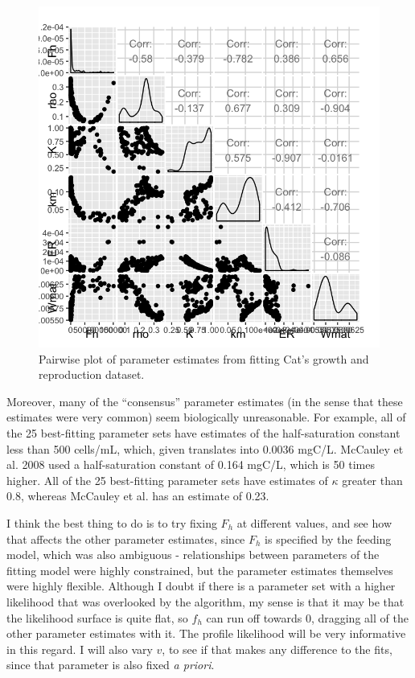 \documentclass[12pt,reqno,final,pdftex]{amsart}\usepackage[]{graphicx}\usepackage[]{color}
\newenvironment{knitrout}{}{} %
\theoremstyle{plain}
\numberwithin{equation}{part}
\begin{document}
\begin{knitrout}\scriptsize
{}\color{fgcolor}\begin{figure}

\includegraphics[width=\linewidth]{figure/Cat-fits-1-1} \hfill{}

\caption[Pairwise plot of parameter estimates from fitting Cat's growth and reproduction dataset]{Pairwise plot of parameter estimates from fitting Cat's growth and reproduction dataset.}\label{fig:Cat-fits-1}
\end{figure}


\end{knitrout}

Moreover, many of the ``consensus'' parameter estimates (in the sense that these estimates were very common) seem biologically unreasonable.
For example, all of the 25 best-fitting parameter sets have estimates of the half-saturation constant less than 500 cells/mL, which, given translates into 0.0036 mgC/L.
McCauley et al. 2008 used a half-saturation constant of 0.164 mgC/L, which is 50 times higher.
All of the 25 best-fitting parameter sets have estimates of $\kappa$ greater than 0.8, whereas McCauley et al. has an estimate of 0.23.

I think the best thing to do is to try fixing $F_h$ at different values, and see how that affects the other parameter estimates, since $F_h$  is specified by the feeding model, which was also ambiguous - relationships between parameters of the fitting model were highly constrained, but the parameter estimates themselves were highly flexible.
Although I doubt if there is a parameter set with a higher likelihood that was overlooked by the algorithm, my sense is that it may be that the likelihood surface is quite flat, so $f_h$ can run off towards 0, dragging all of the other parameter estimates with it.
The profile likelihood will be very informative in this regard.
I will also vary $v$, to see if that makes any difference to the fits, since that parameter is also fixed \emph{a priori}.
\end{document}
